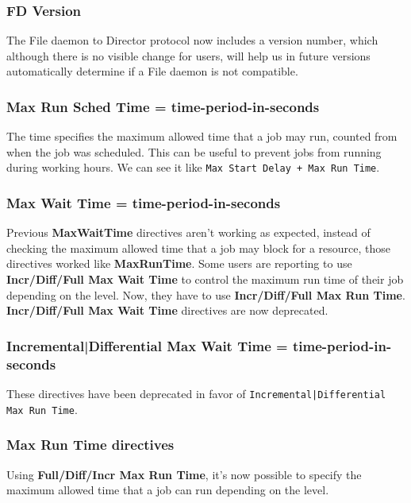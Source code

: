 \subsubsection{FD Version}
The File daemon to Director protocol now includes a version 
number, which although there is no visible change for users, 
will help us in future versions automatically determine
if a File daemon is not compatible.

\subsubsection{Max Run Sched Time = \lt{}time-period-in-seconds\gt{}}
The time specifies the maximum allowed time that a job may run, counted from
when the job was scheduled. This can be useful to prevent jobs from running
during working hours. We can see it like \texttt{Max Start Delay + Max Run
  Time}.

\subsubsection{Max Wait Time = \lt{}time-period-in-seconds\gt{}}
Previous \textbf{MaxWaitTime} directives aren't working as expected, instead
of checking the maximum allowed time that a job may block for a resource,
those directives worked like \textbf{MaxRunTime}. Some users are reporting to
use \textbf{Incr/Diff/Full Max Wait Time} to control the maximum run time of
their job depending on the level. Now, they have to use
\textbf{Incr/Diff/Full Max Run Time}.  \textbf{Incr/Diff/Full Max Wait Time}
directives are now deprecated.

\subsubsection{Incremental|Differential Max Wait Time = \lt{}time-period-in-seconds\gt{}} 

These directives have been deprecated in favor of
\texttt{Incremental|Differential Max Run Time}.

\subsubsection{Max Run Time directives}
Using \textbf{Full/Diff/Incr Max Run Time}, it's now possible to specify the
maximum allowed time that a job can run depending on the level.


